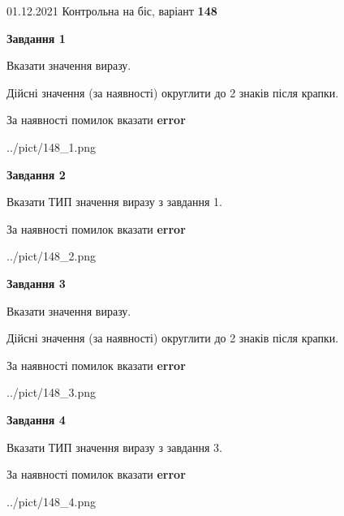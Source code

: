 \documentclass[11pt, ukrainian]{article}
\begin{document}
{01.12.2021 Контрольна на біс, варіант  \No \textbf { 148 }\par}
{
\begin {large}
{\begin {center}\textbf{Завдання 1}\end {center}}\par
Вказати значення виразу. \par
Дійсні значення (за наявності) округлити до 2 знаків після крапки. \par
За наявності помилок вказати \textbf{error}

\begin{center}
	{../pict/148_1.png}
\end{center}
\newpage

{\begin {center}\textbf{Завдання 2}\end {center}}\par
Вказати ТИП значення виразу з завдання 1. \par
За наявності помилок вказати \textbf{error}

\begin{center}
	{../pict/148_2.png}
\end{center}
\newpage

{\begin {center}\textbf{Завдання 3}\end {center}}\par
Вказати значення виразу. \par
Дійсні значення (за наявності) округлити до 2 знаків після крапки. \par
За наявності помилок вказати \textbf{error}

\begin{center}
	{../pict/148_3.png}
\end{center}
\newpage

{\begin {center}\textbf{Завдання 4}\end {center}}\par
Вказати ТИП значення виразу з завдання 3. \par
За наявності помилок вказати \textbf{error}

\begin{center}
	{../pict/148_4.png}
\end{center}
\newpage


\end{large}}
\end{document}
